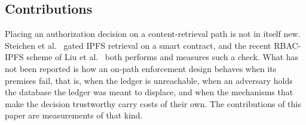 \documentclass[preprint,12pt]{elsarticle}
\begin{document}
\subsection{Contributions}
\label{sec:contributions}

Placing an authorization decision on a content-retrieval path is not in itself
new. Steichen et al.~\cite{steichen2018blockchain} gated IPFS retrieval on a
smart contract, and the recent RBAC-IPFS scheme of Liu et
al.~\cite{liu2026rbacipfs} both performs and measures such a check. What has not
been reported is how an on-path enforcement design behaves when its premises
fail, that is, when the ledger is unreachable, when an adversary holds the
database the ledger was meant to displace, and when the mechanisms that make the
decision trustworthy carry costs of their own. The contributions of this paper
are measurements of that kind.
\end{document}
